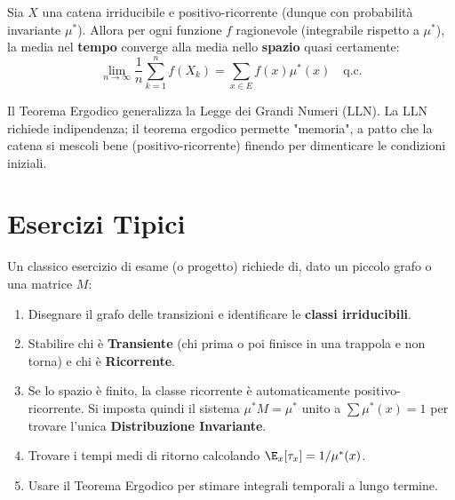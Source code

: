 \begin{theorem}
Sia $X$ una catena irriducibile e positivo-ricorrente (dunque con probabilità invariante $\mu^*$). Allora per ogni funzione $f$ ragionevole (integrabile rispetto a $\mu^*$), la media nel \textbf{tempo} converge alla media nello \textbf{spazio} quasi certamente:
\[ \lim_{n \to \infty} \frac{1}{n} \sum_{k=1}^n f(X_k) = \sum_{x \in E} f(x) \mu^*(x) \quad \text{q.c.} \]
\end{theorem}

Il Teorema Ergodico generalizza la Legge dei Grandi Numeri (LLN). La LLN richiede indipendenza; il teorema ergodico permette "memoria", a patto che la catena si mescoli bene (positivo-ricorrente) finendo per dimenticare le condizioni iniziali.

\section{Esercizi Tipici}

Un classico esercizio di esame (o progetto) richiede di, dato un piccolo grafo o una matrice $M$:
\begin{enumerate}
    \item Disegnare il grafo delle transizioni e identificare le \textbf{classi irriducibili}.
    \item Stabilire chi è \textbf{Transiente} (chi prima o poi finisce in una trappola e non torna) e chi è \textbf{Ricorrente}.
    \item Se lo spazio è finito, la classe ricorrente è automaticamente positivo-ricorrente. Si imposta quindi il sistema $\mu^* M = \mu^*$ unito a $\sum \mu^*(x) = 1$ per trovare l'unica \textbf{Distribuzione Invariante}.
    \item Trovare i tempi medi di ritorno calcolando $\E_x[\tau_x] = 1 / \mu^*(x)$.
    \item Usare il Teorema Ergodico per stimare integrali temporali a lungo termine.
\end{enumerate}
